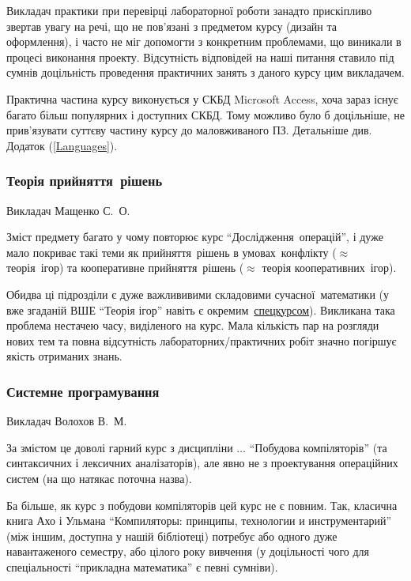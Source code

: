\documentclass[14pt, a4paper]{extarticle}  %
\begin{document}
Викладач практики при перевірці лабораторної роботи занадто прискіпливо звертав увагу на речі, що не пов'язані з предметом курсу (дизайн  та оформлення), і часто не міг допомогти з конкретним проблемами, що виникали в процесі виконання проекту. Відсутність відповідей на наші питання ставило під сумнів доцільність проведення практичних занять з даного курсу цим викладачем. 

Практична частина курсу виконується у СКБД Microsoft Access, хоча зараз існує багато більш популярних і доступних СКБД. Тому можливо було б доцільніше, не прив'язувати суттєву частину курсу до маловживаного ПЗ. Детальніше див. Додаток (\ref{Languages}).

\subsubsection{Теорія прийняття~рішень}
Викладач Мащенко С.~О.

Зміст предмету багато у чому повторює курс ``Дослідження~операцій'', і дуже мало покриває такі теми як прийняття~рішень в умовах~конфлікту ($\approx$ теорія~ігор) та кооперативне прийняття~рішень ($\approx$ теорія кооперативних~ігор). 

Обидва ці підрозділи є  дуже важлививими складовими сучасної~математики (у вже згаданій ВШЕ ``Теорія ігор'' навіть є окремим~\href{https://www.coursera.org/learn/game-theory}{спецкурсом}). 
Викликана така проблема нестачею часу, виділеного на курс.
Мала кількість пар на розгляди нових тем та повна відсутність лабораторних/практичних робіт значно погіршує якість отриманих знань. 


\subsubsection{Системне програмування}

Викладач Волохов В.~М. 

За змістом це доволі гарний курс з дисципліни $\ldots$ ``Побудова компіляторів'' (та синтаксичних і лексичних аналізаторів), але явно не з проектування операційних систем (на що натякає поточна назва). 

Ба більше, як курс з побудови компіляторів цей курс не є повним. Так, класична книга Ахо і Ульмана ``Компиляторы: принципы, технологии и инструментарий'' (між іншим, доступна у нашій бібліотеці) потребує або одного дуже навантаженого семестру, або цілого року вивчення (у доцільності чого для спеціальності ``прикладна математика'' є певні сумніви). 
\end{document}
